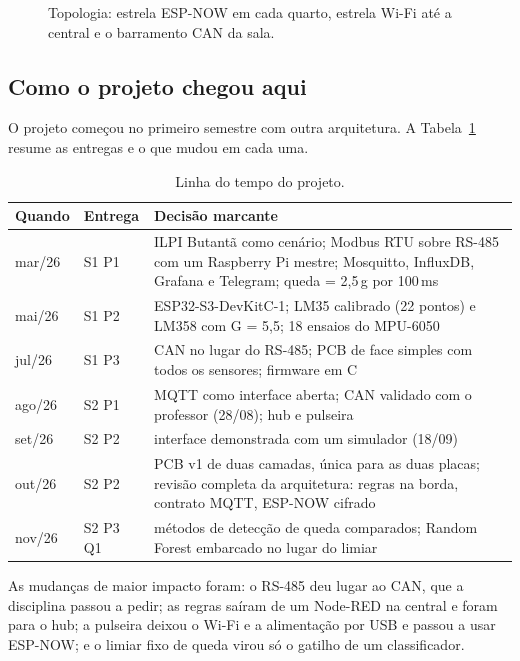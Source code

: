 \begin{figure}[H]
\centering
\resizebox{0.86\linewidth}{!}{}
\caption{Topologia: estrela ESP-NOW em cada quarto, estrela Wi-Fi até a central e o
barramento CAN da sala.}
\label{fig:topologia}
\end{figure}

\subsection{Como o projeto chegou aqui}\label{sec:evolucao}

O projeto começou no primeiro semestre com outra arquitetura. A Tabela~\ref{tab:evolucao}
resume as entregas e o que mudou em cada uma.

\begin{table}[H]
\centering
\caption{Linha do tempo do projeto.}
\label{tab:evolucao}
\small
\begin{tabular}{@{}l>{\raggedright\arraybackslash}p{2.4cm}>{\raggedright\arraybackslash}p{10.2cm}@{}}
\toprule
Quando & Entrega & Decisão marcante \\
\midrule
mar/26 & S1 P1 & ILPI Butantã como cenário; Modbus RTU sobre RS-485 com um Raspberry Pi mestre; Mosquitto, InfluxDB, Grafana e Telegram; queda = 2,5\,g por 100\,ms \\
mai/26 & S1 P2 & ESP32-S3-DevKitC-1; LM35 calibrado (22 pontos) e LM358 com G = 5,5; 18 ensaios do MPU-6050 \\
jul/26 & S1 P3 & CAN no lugar do RS-485; PCB de face simples com todos os sensores; firmware em C \\
ago/26 & S2 P1 & MQTT como interface aberta; CAN validado com o professor (28/08); hub e pulseira \\
set/26 & S2 P2 & interface demonstrada com um simulador (18/09) \\
out/26 & S2 P2 & PCB v1 de duas camadas, única para as duas placas; revisão completa da arquitetura: regras na borda, contrato MQTT, ESP-NOW cifrado \\
nov/26 & S2 P3 Q1 & 22 métodos de detecção de queda comparados; Random Forest embarcado no lugar do limiar \\
\bottomrule
\end{tabular}
\end{table}

As mudanças de maior impacto foram: o RS-485 deu lugar ao CAN, que a disciplina passou a
pedir; as regras saíram de um Node-RED na central e foram para o hub; a pulseira deixou o
Wi-Fi e a alimentação por USB e passou a usar ESP-NOW; e o limiar fixo de queda virou só o
gatilho de um classificador.
